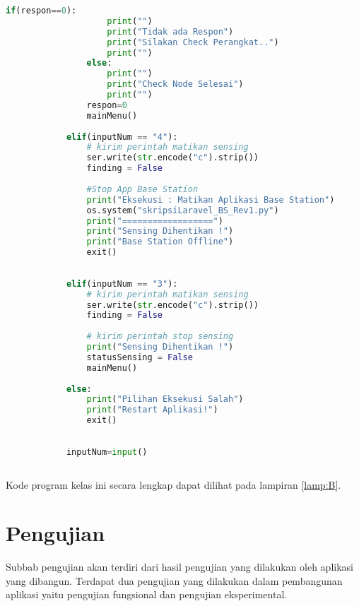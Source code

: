 \begin{itemize}
\begin{lstlisting}[label=tester, language=Python, caption=Metode tester(), numbers=none]
                if(respon==0):
                    print("")
                    print("Tidak ada Respon")
                    print("Silakan Check Perangkat..")
                    print("")
                else:
                    print("")
                    print("Check Node Selesai")
                    print("")
                respon=0
                mainMenu()
                            
            elif(inputNum == "4"):
                # kirim perintah matikan sensing   
                ser.write(str.encode("c").strip())
                finding = False
    
                #Stop App Base Station
                print("Eksekusi : Matikan Aplikasi Base Station")
                os.system("skripsiLaravel_BS_Rev1.py")
                print("==================")
                print("Sensing Dihentikan !")
                print("Base Station Offline")
                exit()
                
                
            elif(inputNum == "3"):
                # kirim perintah matikan sensing   
                ser.write(str.encode("c").strip())
                finding = False
    
                # kirim perintah stop sensing 
                print("Sensing Dihentikan !")
                statusSensing = False
                mainMenu()
            
            else:
                print("Pilihan Eksekusi Salah")
                print("Restart Aplikasi!")
                exit()
    
    
            inputNum=input()
        
    \end{lstlisting}
    
    
    \end{itemize}
    
    Kode program kelas ini secara lengkap dapat dilihat pada lampiran \ref{lamp:B}.
  

\section{Pengujian}
\label{sec:latex}

   Subbab pengujian akan terdiri dari hasil pengujian yang dilakukan oleh aplikasi yang dibangun. Terdapat dua pengujian yang dilakukan dalam pembangunan aplikasi yaitu pengujian fungsional dan pengujian eksperimental.
    
